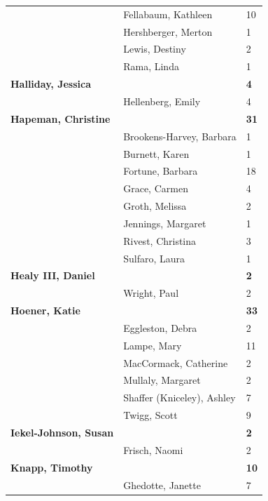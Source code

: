 \documentclass{article}\usepackage[]{graphicx}\usepackage[]{color}
\begin{document}
{\begin{longtable} { >{\raggedright}p{}|p{}p{}}
   & Fellabaum, Kathleen & 10 \\ 
   & Hershberger, Merton & 1 \\ 
   & Lewis, Destiny & 2 \\ 
   \rowcolor[gray]{0.90} & Rama, Linda & 1 \\ 
   \rowcolor[gray]{0.90}\textbf{Halliday, Jessica} &  & \hspace{2cm}\textbf{4} \\ 
   \rowcolor[gray]{0.90} & Hellenberg, Emily & 4 \\ 
  \textbf{Hapeman, Christine} &  & \hspace{2cm}\textbf{31} \\ 
   & Brookens-Harvey, Barbara & 1 \\ 
   & Burnett, Karen & 1 \\ 
   \rowcolor[gray]{0.90} & Fortune, Barbara & 18 \\ 
   \rowcolor[gray]{0.90} & Grace, Carmen & 4 \\ 
   \rowcolor[gray]{0.90} & Groth, Melissa & 2 \\ 
   & Jennings, Margaret & 1 \\ 
   & Rivest, Christina & 3 \\ 
   & Sulfaro, Laura & 1 \\ 
   \rowcolor[gray]{0.90}\textbf{Healy III, Daniel} &  & \hspace{2cm}\textbf{2} \\ 
   \rowcolor[gray]{0.90} & Wright, Paul & 2 \\ 
   \rowcolor[gray]{0.90}\textbf{Hoener, Katie} &  & \hspace{2cm}\textbf{33} \\ 
   & Eggleston, Debra & 2 \\ 
   & Lampe, Mary & 11 \\ 
   & MacCormack, Catherine & 2 \\ 
   \rowcolor[gray]{0.90} & Mullaly, Margaret & 2 \\ 
   \rowcolor[gray]{0.90} & Shaffer (Kniceley), Ashley & 7 \\ 
   \rowcolor[gray]{0.90} & Twigg, Scott & 9 \\ 
  \textbf{Iekel-Johnson, Susan} &  & \hspace{2cm}\textbf{2} \\ 
   & Frisch, Naomi & 2 \\ 
  \textbf{Knapp, Timothy} &  & \hspace{2cm}\textbf{10} \\ 
   \rowcolor[gray]{0.90} & Ghedotte, Janette & 7 \\ 

\end{longtable}}
\end{document}
